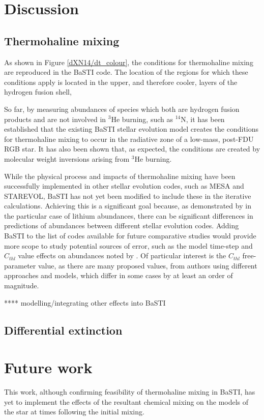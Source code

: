 \documentclass[usenatbib]{mnras}
\begin{document}



\citet{2004astro.ph..5087C}


\section{Discussion}
\subsection{Thermohaline mixing}
As shown in Figure \ref{dXN14/dt_colour}, the conditions for thermohaline mixing are reproduced in the BaSTI code. The location of the regions for which these conditions apply is located in the upper, and therefore cooler, layers of the hydrogen fusion shell,

So far, by measuring abundances of species which both are hydrogen fusion products and are not involved in $^3$He burning, such as $^{14}$N, it has been established that the existing BaSTI stellar evolution model creates the conditions for thermohaline mixing to occur in the radiative zone of a low-mass, post-FDU RGB star. It has also been shown that, as expected, the conditions are created by molecular weight inversions arising from $^{3}$He burning.

While the physical process and impacts of thermohaline mixing have been successfully implemented in other stellar evolution codes, such as MESA and STAREVOL, BaSTI has not yet been modified to include these in the iterative calculations. Achieving this is a significant goal because, as demonstrated by \citet{2015MNRAS.446.2673L} in the particular case of lithium abundances, there can be significant differences in predictions of abundances between different stellar evolution codes. Adding BaSTI to the list of codes available for future comparative studies would provide more scope to study potential sources of error, such as the model time-step and $C_{thl}$ value effects on abundances noted by \citet{2015MNRAS.446.2673L}. Of particular interest is the $C_{thl}$ free-parameter value, as there are many proposed values, from authors using different approaches and models, which differ in some cases by at least an order of magnitude.

**** modelling/integrating other effects into BaSTI



\subsection{Differential extinction}

\section{Future work}

This work, although confirming feasibility of thermohaline mixing in BaSTI, has yet to implement the effects of the resultant chemical mixing on the models of the star at times following the initial mixing.


\end{document}
